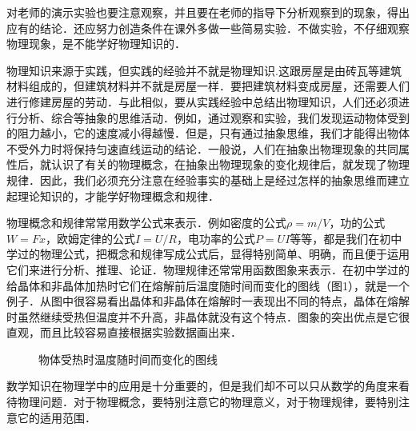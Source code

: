 对老师的演示实验也要注意观察，并且要在老师的指导下分析观察到的现象，得出应有的结论．还应努力创造条件在课外多做一些简易实验．不做实验，不仔细观察物理现象，是不能学好物理知识的．

\vspace*{0.5em}
\vspace*{0.5em}

物理知识来源于实践，但实践的经验并不就是物理知识.这跟房屋是由砖瓦等建筑材料组成的，但建筑材料并不就是房屋一样．要把建筑材料变成房屋，还需要人们进行修建房屋的劳动．与此相似，要从实践经验中总结出物理知识，人们还必须进行分析、综合等抽象的思维活动．例如，通过观察和实验，我们发现运动物体受到的阻力越小，它的速度减小得越慢．但是，只有通过抽象思维，我们才能得出物体不受外力时将保持匀速直线运动的结论．一般说，人们在抽象出物理现象的共同属性后，就认识了有关的物理概念，在抽象出物理现象的变化规律后，就发现了物理规律．因此，我们必须充分注意在经验事实的基础上是经过怎样的抽象思维而建立起理论知识的，才能学好物理概念和规律．

物理概念和规律常常用数学公式来表示．例如密度的公式$\rho=m/V$，功的公式$W=Fx$，欧姆定律的公式$I=U/R$，电功率的公式$P=UI$等等，都是我们在初中学过的物理公式，把概念和规律写成公式后，显得特别简单、明确，而且便于运用它们来进行分析、推理、论证．物理规律还常常用函数图象来表示．在初中学过的给晶体和非晶体加热时它们在熔解前后温度随时间而变化的图线（图1），就是一个例子．从图中很容易看出晶体和非晶体在熔解时一表现出不同的特点，晶体在熔解时虽然继续受热但温度并不升高，非晶体就没有这个特点．图象的突出优点是它很直观，而且比较容易直接根据实验数据画出来．

\begin{figure}[htpb]
    \centering
    \qquad\qquad
    \caption{物体受热时温度随时间而变化的图线}
\end{figure}

数学知识在物理学中的应用是十分重要的，但是我们却不可以只从数学的角度来看待物理问题．对于物理概念，要特别注意它的物理意义，对于物理规律，要特别注意它的适用范围．

